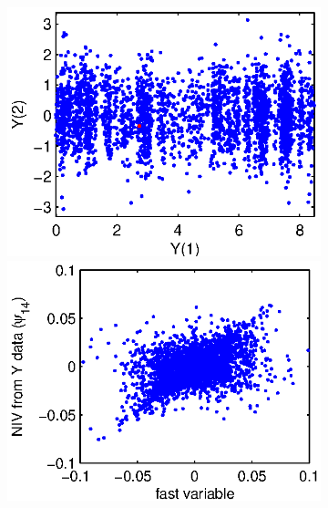 \documentclass[1p]{elsarticle}
\begin{document}
\begin{figure}[h]
%
\begin{subfigure}{0.3\textwidth}
\includegraphics[width=\textwidth]{data_withburst_1}
\includegraphics[width=\textwidth]{fast_var_corr_1}
\caption{}
\end{subfigure}
\begin{subfigure}{0.3\textwidth}

\end{subfigure}
\end{figure}
\end{document}
